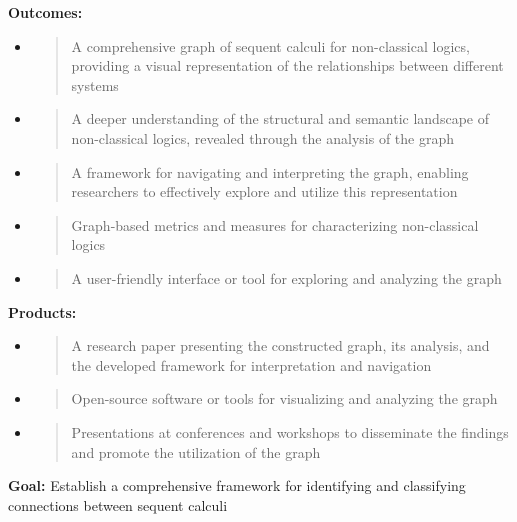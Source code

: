 \textbf{Outcomes:}

\begin{itemize}
\item
  \begin{quote}
  A comprehensive graph of sequent calculi for non-classical logics,
  providing a visual representation of the relationships between
  different systems
  \end{quote}
\item
  \begin{quote}
  A deeper understanding of the structural and semantic landscape of
  non-classical logics, revealed through the analysis of the graph
  \end{quote}
\item
  \begin{quote}
  A framework for navigating and interpreting the graph, enabling
  researchers to effectively explore and utilize this representation
  \end{quote}
\item
  \begin{quote}
  Graph-based metrics and measures for characterizing non-classical
  logics
  \end{quote}
\item
  \begin{quote}
  A user-friendly interface or tool for exploring and analyzing the
  graph
  \end{quote}
\end{itemize}

\textbf{Products:}

\begin{itemize}
\item
  \begin{quote}
  A research paper presenting the constructed graph, its analysis, and
  the developed framework for interpretation and navigation
  \end{quote}
\item
  \begin{quote}
  Open-source software or tools for visualizing and analyzing the graph
  \end{quote}
\item
  \begin{quote}
  Presentations at conferences and workshops to disseminate the findings
  and promote the utilization of the graph
  \end{quote}
\end{itemize}

\textbf{Goal:} Establish a comprehensive framework for identifying and
classifying connections between sequent calculi

